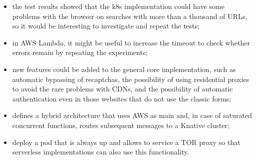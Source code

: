 \documentclass[../thesis.tex]{subfiles}
\begin{document}
\begin{itemize}
    \item the test results showed that the \gls{k8s} implementation could have some problems with the browser on searches with more than a thousand of \acrshort{URL}s, so it would be interesting to investigate and repeat the tests;
    \item in \acrshort{AWS} Lambda, it might be useful to increase the timeout to check whether errors remain by repeating the experiments;
    \item new features could be added to the general core implementation, such as automatic bypassing of \gls{recaptcha}s, the possibility of using residential proxies to avoid the rare problems with \acrshort{CDN}s, and the possibility of automatic authentication even in those websites that do not use the classic forms;
    \item defines a hybrid architecture that uses \acrshort{AWS} as main and, in case of saturated concurrent functions, routes subsequent messages to a Knative cluster;
    \item deploy a \gls{pod} that is always up and allows to service a \acrshort{TOR} proxy so that serverless implementations can also use this functionality.
\end{itemize}
\end{document}
